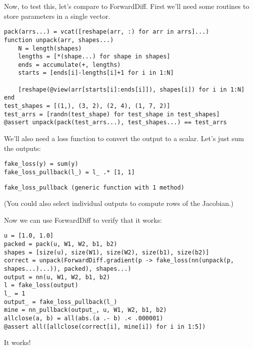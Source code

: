 \documentclass[11pt]{article}
\begin{document}
Now, to test this, let's compare to ForwardDiff. First we'll need some routines to store parameters in a single vector.
\begin{verbatim}
pack(arrs...) = vcat([reshape(arr, :) for arr in arrs]...)
function unpack(arr, shapes...)
    N = length(shapes)
    lengths = [*(shape...) for shape in shapes]
    ends = accumulate(+, lengths)
    starts = [ends[i]-lengths[i]+1 for i in 1:N]

    [reshape(@view(arr[starts[i]:ends[i]]), shapes[i]) for i in 1:N]
end
test_shapes = [(1,), (3, 2), (2, 4), (1, 7, 2)]
test_arrs = [randn(test_shape) for test_shape in test_shapes]
@assert unpack(pack(test_arrs...), test_shapes...) == test_arrs
\end{verbatim}
We'll also need a loss function to convert the output to a scalar. Let's just sum the outputs:
\begin{verbatim}
fake_loss(y) = sum(y)
fake_loss_pullback(l_) = l_ .* [1, 1]
\end{verbatim}
\begin{verbatim}
fake_loss_pullback (generic function with 1 method)
\end{verbatim}

(You could also select individual outputs to compute rows of the Jacobian.)

Now we can use ForwardDiff to verify that it works:
\begin{verbatim}
u = [1.0, 1.0]
packed = pack(u, W1, W2, b1, b2)
shapes = [size(u), size(W1), size(W2), size(b1), size(b2)]
correct = unpack(ForwardDiff.gradient(p -> fake_loss(nn(unpack(p, shapes...)...)), packed), shapes...)
output = nn(u, W1, W2, b1, b2)
l = fake_loss(output)
l_ = 1
output_ = fake_loss_pullback(l_)
mine = nn_pullback(output_, u, W1, W2, b1, b2)
allclose(a, b) = all(abs.(a .- b) .< .000001)
@assert all([allclose(correct[i], mine[i]) for i in 1:5])
\end{verbatim}
It works!
\end{document}
